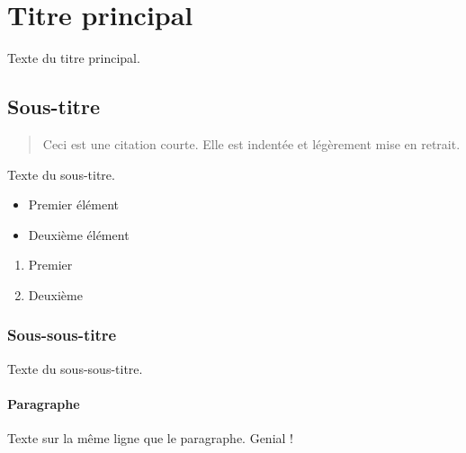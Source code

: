 \documentclass[a4paper,10pt]{article}
\begin{document}
\section{Titre principal}
Texte du titre principal.

\subsection{Sous-titre}
\begin{quote}
Ceci est une citation courte. Elle est indentée et légèrement mise en retrait.
\end{quote}
Texte du sous-titre.

\begin{itemize}[label=\textbullet, left=1em]
  \item Premier élément
  \item Deuxième élément
\end{itemize}

\begin{enumerate}[label=\arabic*., left=2em]
  \item Premier
  \item Deuxième
\end{enumerate}


\subsubsection{Sous-sous-titre}
Texte du sous-sous-titre.
 
\paragraph{Paragraphe}
Texte sur la même ligne que le paragraphe.
Genial !
\end{document}
